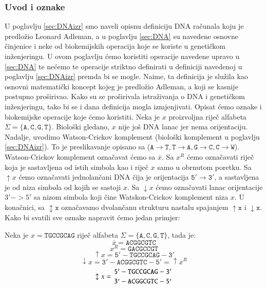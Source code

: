 \documentclass[a4paper,oneside,12pt]{memoir} %
\begin{document}
\begin{spacing}{1.5}
\subsubsection{Uvod i oznake}
U poglavlju \ref{sec:DNAizr} smo naveli opisnu definiciju DNA računala koju je predložio Leonard Adleman, a u poglavlju \ref{sec:DNA} su navedene osnovne činjenice i neke od biokemijskih operacija koje se koriste u genetičkom inženjeringu. U ovom poglavlju ćemo koristiti operacije navedene upravo u \ref{sec:DNA} te nećemo te operacije striktno definirati u definiciji navedenoj u poglavlju \ref{sec:DNAizr} premda bi se mogle. Naime, ta definicija je služila kao osnovni matematički koncept kojeg je predložio Adleman, a koji se kasnije postupno proširivao. Kako su se proširivala istraživanja o DNA i genetičkom inženjeringu, tako bi se i dana definicija mogla izmjenjivati. Opisat ćemo oznake i biokemijske operacije koje ćemo koristiti.
Neka je $x$ proizvoljna riječ alfabeta $\Sigma =\{\mathtt{A,C,G,T}\}$. Biološki gledano, $x$ nije još DNA lanac jer nema orijentaciju. Nadalje, uvodimo Watson-Crickov komplement (biološki komplement u poglavlju \ref{sec:DNAizr}). To je preslikavanje opisano sa ($\mathtt{A \to T, T \to A, G \to C, C \to W}$). Watson-Crickov komplement označavat ćemo sa $\overline{x}$. Sa $x^R$ ćemo označavati riječ koja je sastavljena od istih simbola kao i riječ $x$ samo u obrnutom poretku. Sa $\mathtt{\uparrow} x$ ćemo označavati  jednolančani DNA čija je orijentacija $\mathtt{5' \to 3'}$, a sastavljena  je od niza simbola od kojih se sastoji $x$. Sa $\downarrow x$ ćemo označavati lanac orijentacije $3'->5'$ sa nizom simbola koji čine Watskon-Crickov komplement niza $x$. U konačnici, sa $\mathtt{\updownarrow x}$ označavamo dvolančanu strukturu nastalu spajanjem $\mathtt{\uparrow x}$ i $\mathtt{\downarrow x}$. Kako bi svatili sve oznake napravit ćemo jedan primjer:
\begin{exa}
Neka je $x=\mathtt{TGCCGCAG}$ riječ alfabeta $\Sigma=\mathtt{\{A,C,G,T\}}$, tada je:
\[\overline{x}= \mathtt{ACGGCGTC}\]
\[x^R=\mathtt{GACGCCGT}\]
\[\uparrow x=\mathtt{5'-TGCCGCAG-3'}\]
\[\downarrow x=\mathtt{3'-ACGGCGTC-5'}=	\uparrow \overline{x}^R\]
\[\updownarrow x=\mathtt{{5'-TGCCGCAG-3' \atop 3'-ACGGCGTC-5'}}\]
\end{exa}

\end{spacing}
\end{document}
